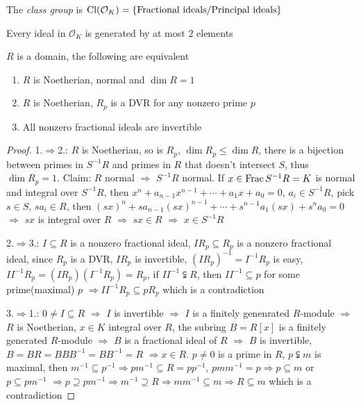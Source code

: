 \documentclass[../main.tex]{subfiles}
\begin{document}
\begin{definition}
The \textit{class group} is $\operatorname{Cl}(\mathcal O_K)=\{\text{Fractional ideals}/\text{Principal ideals}\}$
\end{definition}

\begin{exercise}
Every ideal in $\mathcal O_K$ is generated by at most $2$ elements
\end{exercise}

\begin{theorem}
$R$ is a domain, the following are equivalent
\begin{enumerate}
\item $R$ is Noetherian, normal and $\dim R=1$
\item $R$ is Noetherian, $R_p$ is a DVR for any nonzero prime $p$
\item All nonzero fractional ideals are invertible
\end{enumerate}
\end{theorem}

\begin{proof}
1.$\Rightarrow$2.: $R$ is Noetherian, so is $R_p$, $\dim R_p\leq\dim R$, there is a bijection between primes in $S^{-1}R$ and primes in $R$ that doesn't intersect $S$, thus $\dim R_p=1$. Claim: $R$ normal $\Rightarrow$ $S^{-1}R$ normal. If $x\in\operatorname{Frac}{S^{-1}R}=K$ is normal and integral over $S^{-1}R$, then $x^n+a_{n-1}x^{n-1}+\cdots+a_1x+a_0=0$, $a_i\in S^{-1}R$, pick $s\in S$, $sa_i\in R$, then $(sx)^n+sa_{n-1}(sx)^{n-1}+\cdots+s^{n-1}a_1(sx)+s^na_0=0$ $\Rightarrow$ $sx$ is integral over $R$ $\Rightarrow $ $sx\in R$ $\Rightarrow$ $x\in S^{-1}R$ \par
2.$\Rightarrow$3.: $I\subseteq R$ is a nonzero fractional ideal, $IR_p\subseteq R_p$ is a nonzero fractional ideal, since $R_p$ is a DVR, $IR_p$ is invertible, $(IR_p)^{-1}=I^{-1}R_p$ is easy, $II^{-1}R_p=(IR_p)(I^{-1}R_p)=R_p$, if $II^{-1}\subsetneqq R$, then $II^{-1}\subseteq p$ for some prime(maximal) $p$ $\Rightarrow II^{-1}R_p\subseteq pR_p$ which is a contradiction \par
3.$\Rightarrow$1.: $0\neq I\subseteq R$ $\Rightarrow$ $I$ is invertible $\Rightarrow$ $I$ is a finitely genenrated $R$-module $\Rightarrow$ $R$ is Noetherian, $x\in K$ integral over $R$, the subring $B=R[x]$ is a finitely generated $R$-module $\Rightarrow$ $B$ is a fractional ideal of $R$ $\Rightarrow$ $B$ is invertible, $B=BR=BBB^{-1}=BB^{-1}=R$ $\Rightarrow x\in R$. $p\neq0$ is a prime in $R$, $p\subsetneqq m$ is maximal, then $m^{-1}\subseteq p^{-1}\Rightarrow pm^{-1}\subseteq R=pp^{-1}$, $pmm^{-1}=p\Rightarrow p\subseteq m$ or $p\subseteq pm^{-1}$ $\Rightarrow p\supseteq pm^{-1}\Rightarrow m^{-1}\supseteq R\Rightarrow mm^{-1}\subseteq m\Rightarrow R\subseteq m$ which is a contradiction
\end{proof}
\end{document}
